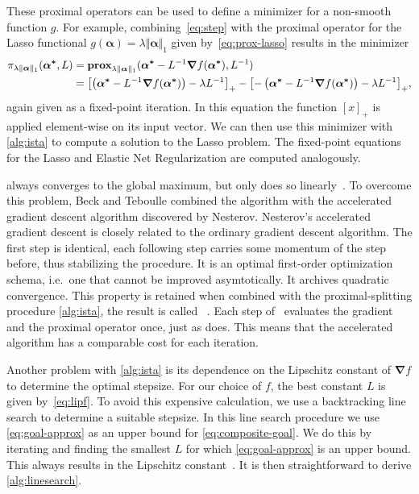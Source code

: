 These proximal operators can be used to define a minimizer for a non-smooth
function \(g\).
For example, combining~\cref{eq:step} with the proximal operator for the
Lasso functional \(g(\bm{\alpha}) = \lambda \Vert \bm{\alpha} \Vert_1\) given by~\cref{eq:prox-lasso} results in
the minimizer
\begin{align*}
  \pi_{\lambda \Vert \bm{\alpha} \Vert_1}(\bm{\alpha^*} ,L)
  &=  \prox[\(\lambda \Vert \bm{\alpha} \Vert_1\)]{\bm{\alpha^*} - L^{-1} \bm{\nabla} f (\bm{\alpha^*})}{L^{-1}} \\
  &= {\left[ \left(\bm{\alpha^*} - L^{-1} \bm{\nabla} f (\bm{\alpha^*}) \right) - \lambda L^{-1} \right]}_+ -
    {\left[ -\left(\bm{\alpha^*} - L^{-1} \bm{\nabla} f (\bm{\alpha^*}) \right) - \lambda L^{-1} \right]}_+,
\end{align*}
again given as a fixed-point iteration.
In this equation the function \( \left[ x \right]_+ \) is applied element-wise on its input vector.
We can then use this minimizer with \cref{alg:ista} to compute a solution to
the Lasso problem.
The fixed-point equations for the Lasso and Elastic Net Regularization are
computed analogously.

\ista always converges to the global maximum, but only does so linearly~\cite{fista}.
To overcome this problem, Beck and Teboulle combined the \ista algorithm with
the accelerated gradient descent algorithm discovered by Nesterov. 
Nesterov's accelerated gradient descent is closely related to the ordinary
gradient descent algorithm.
The first step is identical, each following step carries some momentum of the
step before, thus stabilizing the procedure.
It is an optimal first-order optimization schema, i.e.~one that cannot be
improved asymtotically.
It archives quadratic convergence.
This property is retained when combined with the proximal-splitting procedure \cref{alg:ista}, the result is called \fista~\cite{fista}.
Each step of \fista\ evaluates the gradient and the proximal operator once, just as \ista does.
This means that the accelerated algorithm has a comparable cost for each iteration.

Another problem with \cref{alg:ista} is its dependence on the Lipschitz constant of
\(\bm{\nabla} f\) to determine the optimal stepsize.
For our choice of \(f\), the best constant \(L\) is given by~\cref{eq:lipf}.
To avoid this expensive calculation, we use a backtracking line search to
determine a suitable stepsize.
In this line search procedure we use \cref{eq:goal-approx} as an upper bound for \cref{eq:composite-goal}.
We do this by iterating and finding the smallest \(L\) for which
\cref{eq:goal-approx} is an upper bound.
This always results in the Lipschitz constant~\cite{fista}.
It is then straightforward to derive \cref{alg:linesearch}.

